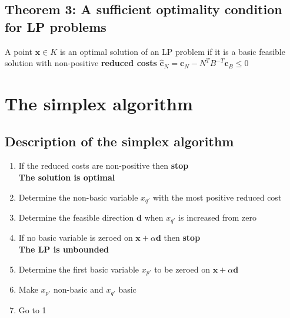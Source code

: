 \documentclass[11pt,a4paper]{article}
\begin{document}
\subsection*{Theorem 3: A sufficient optimality condition for LP problems}
A point $\textbf{x} \in K$ is an optimal solution of an LP problem if it is a basic feasible solution with non-positive \textbf{reduced costs} $\widehat{\textbf{c}}_N = \textbf{c}_N - N^{T}B^{-T}\textbf{c}_B \le 0$

\section*{The simplex algorithm}
\subsection*{Description of the simplex algorithm}
\begin{enumerate}
	\item If the reduced costs are non-positive then \textbf{stop} \\
		\textbf{The solution is optimal}
	\item Determine the non-basic variable $x_{q'}$ with the most positive reduced cost
	\item Determine the feasible direction $\textbf{d}$ when $x_{q'}$ is increased from zero
	\item If no basic variable is zeroed on $\textbf{x} + \alpha \textbf{d}$ then \textbf{stop} \\
		\textbf{The LP is unbounded}
	\item Determine the first basic variable $x_{p'}$ to be zeroed on $\textbf{x} + \alpha \textbf{d}$
	\item Make $x_{p'}$ non-basic and $x_{q'}$ basic
	\item Go to 1
\end{enumerate}
\end{document}
